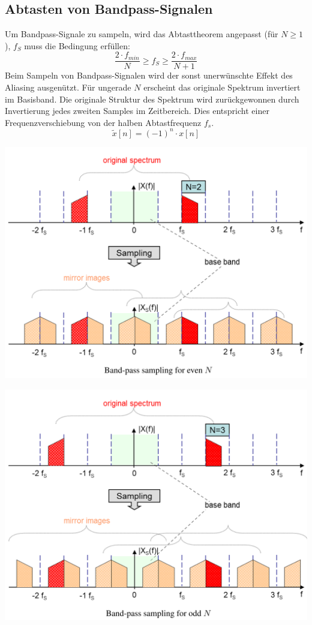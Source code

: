 \subsection{Abtasten von Bandpass-Signalen}
Um Bandpass-Signale zu sampeln, wird das Abtasttheorem angepasst (für $N\geq 1$), $f_S$ muss die Bedingung erfüllen:
\[ \frac{2\cdot f_{min}}{N} \geq f_S \geq \frac{2\cdot f_{max}}{N+1} \]
Beim Sampeln von Bandpass-Signalen wird der sonst unerwünschte Effekt des Aliasing ausgenützt. Für ungerade $N$ erscheint das originale Spektrum invertiert im Basisband.
Die originale Struktur des Spektrum wird zurückgewonnen durch Invertierung jedes zweiten Samples im Zeitbereich. Dies entspricht einer Frequenzverschiebung von der halben Abtastfrequenz $f_s$.
\[ \tilde{x}[n] = (-1)^n \cdot x[n] \]

\begin{minipage}{.475\textwidth}
	\begin{flushleft}
		\includegraphics[width=\textwidth]{../fig/bandpass_even}
	\end{flushleft}
\end{minipage}
\begin{minipage}{.475\textwidth}
	\begin{flushleft}
		\includegraphics[width=\textwidth]{../fig/bandpass_odd}
	\end{flushleft}
\end{minipage}

